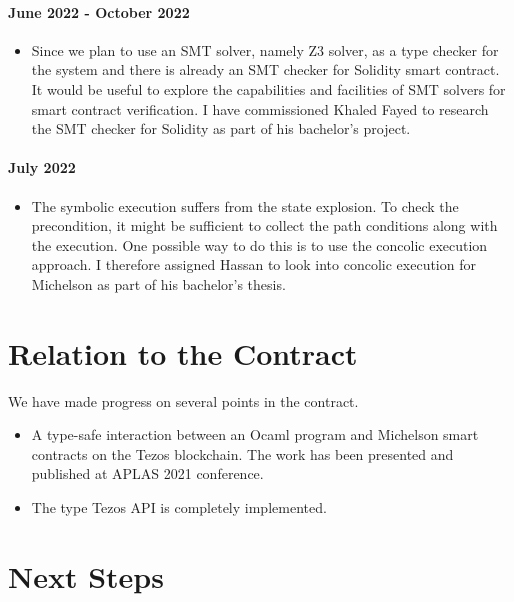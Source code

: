 \documentclass[a4paper,11pt]{article}
\begin{document}
\paragraph{June 2022 - October 2022} 
\begin{itemize}
\item Since we plan to use an SMT solver, namely Z3  solver, as a type checker for the system and there is already an SMT checker for Solidity smart contract. It would be useful to explore the capabilities and facilities of SMT solvers for smart contract verification. I have commissioned Khaled Fayed to research the SMT checker for Solidity as part of his bachelor's project.
\end{itemize}

\paragraph{July 2022}
\begin{itemize}
\item The symbolic execution suffers from the state explosion. To check the precondition, it might be sufficient to collect the path conditions along with the execution. One possible way to do this is to use the concolic execution approach. I therefore assigned Hassan to look into concolic execution for Michelson as part of his bachelor's thesis.
\end{itemize}

\section{Relation to the Contract}
\label{sec:relation-contract}

We have made progress on several points in the contract.
\begin{itemize}
\item A type-safe interaction between an Ocaml program and Michelson smart contracts on the Tezos blockchain. The work has been presented and published at APLAS 2021 conference. 
\item The type Tezos API is completely implemented.

\end{itemize}


\section{Next Steps}
\end{document}
